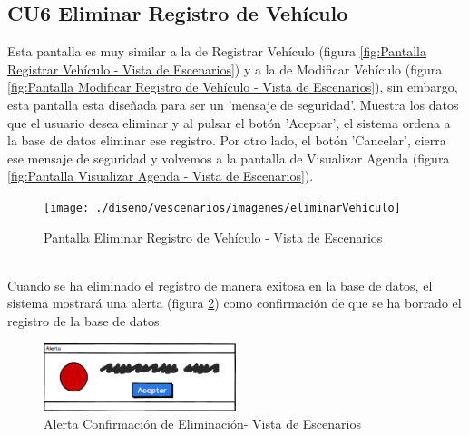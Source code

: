 \subsection{CU6 Eliminar Registro de Vehículo}
Esta pantalla es muy similar a la de Registrar Vehículo (figura \ref{fig:Pantalla Registrar Vehículo - Vista de Escenarios}) y a la de Modificar Vehículo (figura \ref{fig:Pantalla Modificar Registro de Vehículo - Vista de Escenarios}), sin embargo, esta pantalla esta diseñada para ser un 'mensaje de seguridad'. Muestra los datos que el usuario desea eliminar y al pulsar el botón 'Aceptar', el sistema ordena a la base de datos eliminar ese registro. Por otro lado, el botón 'Cancelar', cierra ese mensaje de seguridad y volvemos a la pantalla de Visualizar Agenda (figura \ref{fig:Pantalla Visualizar Agenda - Vista de Escenarios}).
\\
\begin{figure}[!h]
	\centering
	\texttt{[image: ./diseno/vescenarios/imagenes/eliminarVehículo]}
	\caption{Pantalla Eliminar Registro de Vehículo - Vista de Escenarios}
	\label{fig:Pantalla Eliminar Registro de Vehículo - Vista de Escenarios}
\end{figure}
\\
Cuando se ha eliminado el registro de manera exitosa en la base de datos, el sistema mostrará una alerta (figura \ref{fig:Alerta4 - Vista de Escenarios}) como confirmación de que se ha borrado el registro de la base de datos.
\begin{figure}[!h]
	\centering
	\includegraphics[width=0.5\textwidth]{./diseno/vescenarios/imagenes/alerta}
	\caption{Alerta Confirmación de Eliminación- Vista de Escenarios}
	\label{fig:Alerta4 - Vista de Escenarios}
\end{figure}